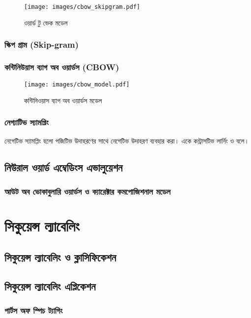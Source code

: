 \documentclass{article}[book]
\begin{document}
\begin{figure}[htbp] %
   \centering
   \texttt{[image: images/cbow\_skipgram.pdf]} 
   \caption{ওয়ার্ড টু ভেক মডেল}
   \label{fig:cbowskipgram}
\end{figure} 


\subsubsection{স্কিপ গ্রাম (Skip-gram)}
\subsubsection{কন্টিনিউয়াস ব্যাগ অব ওয়ার্ডস (CBOW)}
\begin{figure}[htbp] %
   \centering
   \texttt{[image: images/cbow\_model.pdf]} 
   \caption{কন্টিনিওয়াস ব্যাগ অব ওয়ার্ডস মডেল}
   \label{fig:cbow}
\end{figure} 

\subsubsection{নেগ্যাটিভ স্যামপ্লিং}
নেগেটিভ স্যামপ্লিং হলো পজিটিভ উদাহরণের সাথে নেগেটিভ উদাহরণ ব্যবহার করা। একে কন্ট্রাসটিভ লার্নিং ও বলে। 
\subsection{নিউরাল ওয়ার্ড এম্বেডিংস এভালুয়েশন }

\subsubsection{আউট অব ভোকাবুলারি ওয়ার্ডস ও ক্যারেক্টার কমপোজিশনাল মডেল}


\section{সিকুয়েন্স ল্যাবেলিং }
\subsection{সিকুয়েন্স ল্যাবেলিং ও ক্লাসিফিকেশন}
\subsection{সিকুয়েন্স ল্যাবেলিং এপ্লিকেশন}
\subsubsection{পার্টস অফ স্পিচ ট্যাগিং}
\end{document}
